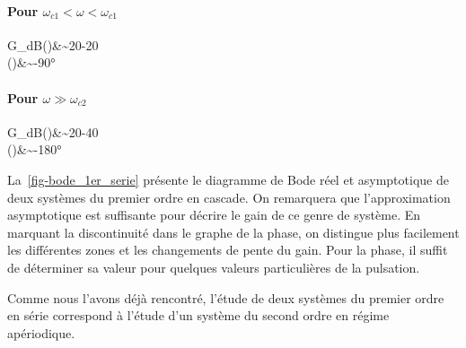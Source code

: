 \paragraph{Pour $\omega_{c1}<\omega<\omega_{c1}$}
\begin{bequation}
G_{dB}(\omega)&\sim20-20\\
\phi(\omega)&\sim-90\si{\degree}
\end{bequation}
\paragraph{Pour $\omega\gg\omega_{c2}$}
\begin{bequation}
G_{dB}(\omega)&\sim20-40\\
\phi(\omega)&\sim-180\si{\degree}
\end{bequation}

La~\cref{fig-bode_1er_serie} présente le diagramme de Bode réel et 
asymptotique de deux systèmes du premier ordre en cascade. On remarquera 
que l'approximation asymptotique est suffisante pour décrire le gain de ce 
genre de système. En marquant la discontinuité dans le graphe de la phase, 
on distingue plus facilement les différentes zones et les changements de 
pente du gain. Pour la phase, il suffit de déterminer sa valeur pour 
quelques valeurs particulières de la pulsation. 

Comme nous l'avons déjà rencontré, l'étude de deux systèmes du premier 
ordre en série correspond à l'étude d'un système du second ordre en 
régime apériodique.

